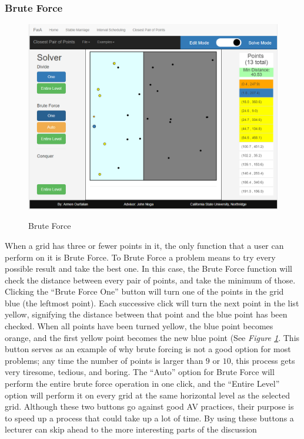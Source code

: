 \subsubsection{Brute Force}
\begin{figure}[H]
	\caption{Brute Force}
	\includegraphics[width=\linewidth]
	{images/closest-pair-of-points/cpop-brute-force.png}
	\label{fig-cpop-brute-force}
	\centering
\end{figure}
\hspace{-0.3in}
When a grid has three or fewer points in it, the 
only function that a user can perform on it is Brute Force. 
To Brute Force a problem means to try every possible result and 
take the best one. In this case, the Brute Force function will check the distance
between every pair of points, and take the minimum of those.
\newline\newline
Clicking the ``Brute Force One'' button will turn one of the points in the grid blue
(the leftmost point). Each successive click will turn the next point in the list yellow, 
signifying the distance between that point and the blue point has been checked. 
When all points have been turned yellow, the blue point becomes orange, and the first 
yellow point becomes the new blue point (See \textit{Figure \ref{fig-cpop-brute-force}}. 
This button serves as an example of why 
brute forcing is not a good option for most problems; any time the number of points
is larger than $9$ or $10$, this process gets very tiresome, tedious, and boring. 
\newline\newline
The ``Auto'' option for Brute Force will perform the entire brute force operation in 
one click, and the ``Entire Level'' option will perform it on every grid at the same 
horizontal level as the selected grid. 
Although these two buttons go against good AV practices, their purpose is to 
speed up a process that could take up a lot of time. 
By using these buttons a lecturer can skip ahead to the more interesting parts 
of the discussion

